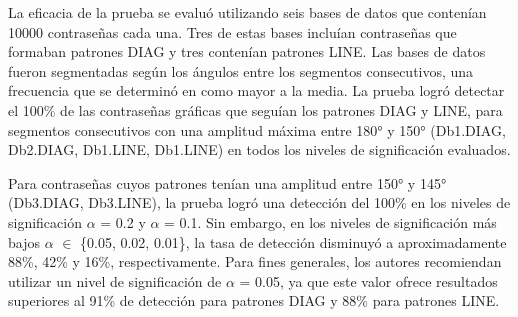 \documentclass[12pt]{report}
\begin{document}
La eficacia de la prueba se evaluó utilizando seis bases de datos que contenían 10000 contraseñas cada una. Tres de estas bases incluían contraseñas que formaban patrones DIAG y tres contenían patrones LINE. Las bases de datos fueron segmentadas según los ángulos entre los segmentos consecutivos, una frecuencia que se determinó en \cite{5} como mayor a la media. La prueba logró detectar el 100\% de las contraseñas gráficas que seguían los patrones DIAG y LINE, para segmentos consecutivos con una amplitud máxima entre 180° y 150° (Db1.DIAG, Db2.DIAG, Db1.LINE, Db1.LINE) en todos los niveles de significación evaluados.

Para contraseñas cuyos patrones tenían una amplitud entre 150° y 145° (Db3.DIAG, Db3.LINE), la prueba logró una detección del 100\% en los niveles de significación $\alpha$ = 0.2 y $\alpha$ = 0.1. Sin embargo, en los niveles de significación más bajos  $\alpha$ $\in$ \{0.05, 0.02, 0.01\}, la tasa de detección disminuyó a aproximadamente 88\%, 42\% y 16\%, respectivamente. Para fines generales, los autores recomiendan utilizar un nivel de significación de $\alpha$ = 0.05, ya que este valor ofrece resultados superiores al 91\% de detección para patrones DIAG y 88\% para patrones LINE.


\end{document}
